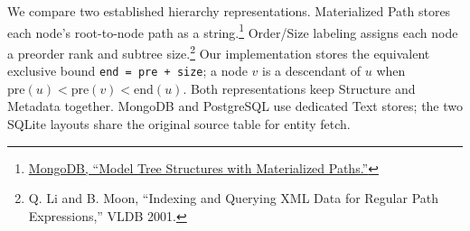 \documentclass[10pt]{article}
\newcommand{\code}[1]{\texttt{#1}}
\begin{document}
We compare two established hierarchy representations. Materialized Path stores
each node's root-to-node path as a string.\footnote{\href{https://www.mongodb.com/docs/v8.0/tutorial/model-tree-structures-with-materialized-paths/}{MongoDB,
``Model Tree Structures with Materialized Paths.''}} Order/Size labeling
assigns each node a preorder rank and subtree size.\footnote{Q. Li and B. Moon,
``Indexing and Querying XML Data for Regular Path Expressions,'' VLDB 2001.}
Our implementation stores the equivalent exclusive bound
\code{end = pre + size}; a node $v$ is a descendant of $u$ when
$\mathrm{pre}(u) < \mathrm{pre}(v) < \mathrm{end}(u)$. Both representations keep
Structure and Metadata together. MongoDB and PostgreSQL use dedicated Text
stores; the two SQLite layouts share the original source table for entity
fetch.
\end{document}
